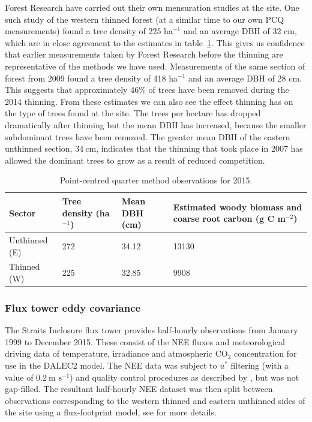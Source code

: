\documentclass[draft,linenumbers]{agujournal}
\begin{document}
Forest Research have carried out their own mensuration studies at the site. One such study of the western thinned forest (at a similar time to our own PCQ measurements) found a tree density of 225 ha\(^{-1}\) and an average DBH of 32 cm, which are in close agreement to the estimates in table~\ref{table:cwoo_obs}. This gives us confidence that earlier measurements taken by Forest Research before the thinning are representative of the methods we have used. Measurements of the same section of forest from 2009 found a tree density of 418 ha\(^{-1}\) and an average DBH of 28 cm. This suggests that approximately 46\% of trees have been removed during the 2014 thinning. From these estimates we can also see the effect thinning has on the type of trees found at the site. The trees per hectare has dropped dramatically after thinning but the mean DBH has increased, because the smaller subdominant trees have been removed. The greater mean DBH of the eastern unthinned section, \(34~\text{cm}\), indicates that the thinning that took place in 2007 has allowed the dominant trees to grow as a result of reduced competition.

\begin{table}[ht] 
	\caption{Point-centred quarter method observations for 2015.}
\begin{center}
	\begin{tabular}{| l | p{2cm} | p{2cm} | p{4.5cm} |}
	\hline
	Sector & Tree density (ha\(^{-1}\)) & Mean DBH (cm) & Estimated woody biomass and coarse root carbon (g C m\(^{-2}\)) \\ \hline
	Unthinned (E) & 272 & 34.12 & 13130 \\ \hline
	Thinned (W) & 225 & 32.85 & 9908 \\ \hline
	\end{tabular}
	\label{table:cwoo_obs}
\end{center} 
\end{table}

\subsubsection{Flux tower eddy covariance} \label{sec:eddycov} 

The Straits Inclosure flux tower provides half-hourly observations from January 1999 to December 2015. These consist of the NEE fluxes and meteorological driving data of temperature, irradiance and atmospheric CO\(_{2}\) concentration for use in the DALEC2 model. The NEE data was subject to \(u^*\) filtering (with a value of \(0.2~\text{m s}^{-1}\)) and quality control procedures as described by \citet{papale2006towards}, but was not gap-filled. The resultant half-hourly NEE dataset was then split between observations corresponding to the western thinned and eastern unthinned sides of the site using a flux-footprint model, see \citet{wilkinson2015effects} for more details.  
\end{document}
